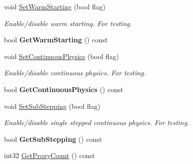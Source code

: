 \begin{DoxyCompactItemize}
\item 
\hypertarget{classb2_world_a8e8c12142e8c4884a18787926a261359}{void \hyperlink{classb2_world_a8e8c12142e8c4884a18787926a261359}{Set\-Warm\-Starting} (bool flag)}\label{classb2_world_a8e8c12142e8c4884a18787926a261359}

\begin{DoxyCompactList}\small\item\em Enable/disable warm starting. For testing. \end{DoxyCompactList}\item 
\hypertarget{classb2_world_af7679b68ff6bf97d31a6136efaee562e}{bool {\bfseries Get\-Warm\-Starting} () const }\label{classb2_world_af7679b68ff6bf97d31a6136efaee562e}

\item 
\hypertarget{classb2_world_a536dd9181c2e20096073e3cfe2c8530a}{void \hyperlink{classb2_world_a536dd9181c2e20096073e3cfe2c8530a}{Set\-Continuous\-Physics} (bool flag)}\label{classb2_world_a536dd9181c2e20096073e3cfe2c8530a}

\begin{DoxyCompactList}\small\item\em Enable/disable continuous physics. For testing. \end{DoxyCompactList}\item 
\hypertarget{classb2_world_aa11dbc1175a7a458e007722ab7287ff1}{bool {\bfseries Get\-Continuous\-Physics} () const }\label{classb2_world_aa11dbc1175a7a458e007722ab7287ff1}

\item 
\hypertarget{classb2_world_ae8aacc78ea4753075067daff51b61778}{void \hyperlink{classb2_world_ae8aacc78ea4753075067daff51b61778}{Set\-Sub\-Stepping} (bool flag)}\label{classb2_world_ae8aacc78ea4753075067daff51b61778}

\begin{DoxyCompactList}\small\item\em Enable/disable single stepped continuous physics. For testing. \end{DoxyCompactList}\item 
\hypertarget{classb2_world_ae3922f4935ad0dd7f85eea7550e18c5d}{bool {\bfseries Get\-Sub\-Stepping} () const }\label{classb2_world_ae3922f4935ad0dd7f85eea7550e18c5d}

\item 
\hypertarget{classb2_world_a67f1f9fbdd85abd2100104c5eabe17cb}{int32 \hyperlink{classb2_world_a67f1f9fbdd85abd2100104c5eabe17cb}{Get\-Proxy\-Count} () const }\label{classb2_world_a67f1f9fbdd85abd2100104c5eabe17cb}


\end{DoxyCompactItemize}
